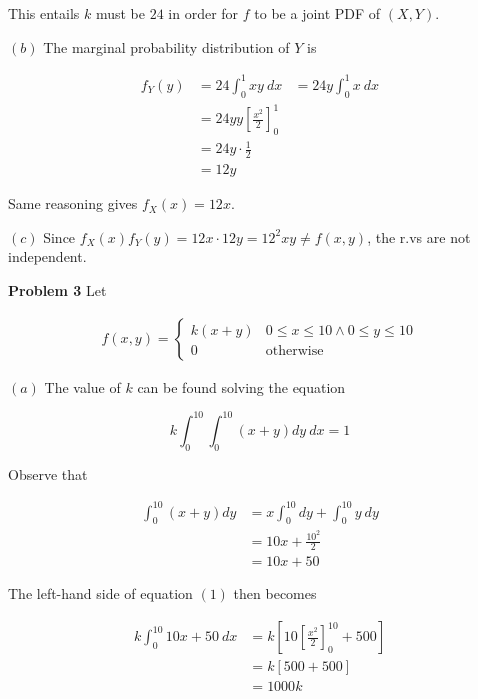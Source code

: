 \documentclass[a4paper, 12pt]{article}
\begin{document}
This entails $k$ must be $24$ in order for $f$ to be a joint PDF of $(X, Y)$.


$(b)$ The marginal probability distribution of $Y$ is 

\begin{align*}
    f_Y(y) &= 24\int_0^1 xy ~ dx &= 24y \int_0^1 x ~ dx \\ 
                       &=24y y \left[ \frac{x^2}{2} \right]_0^1 \\ 
                       &= 24 y \cdot \frac{1}{2} \\ 
                       &= 12y
\end{align*}


Same reasoning gives $f_X(x) = 12x$.

$(c)$ Since $f_X(x) f_Y(y) = 12x \cdot 12y = 12^2xy \neq f(x, y)$,
the r.vs are not independent.

\pagebreak 

\textbf{Problem 3} Let 

\begin{align*}
    f(x, y) = \begin{cases}
        k(x + y) & 0 \leq x \leq 10 \land  0 \leq y \leq 10 \\ 
        0 & \text{otherwise}
    \end{cases}
\end{align*}

$(a)$ The value of $k$ can be found solving the equation

\begin{equation}
    k \int_0^{10} \int_0^{10} (x + y) dy ~ dx = 1
\end{equation}

Observe that 

\begin{align*}
    \int_0^{10}(x+y) dy &= x\int_0^{10} dy + \int_0^{10} y ~ dy \\ 
                        &= 10x + \frac{10^2}{2} \\ 
                        &= 10x + 50
\end{align*}

The left-hand side of equation $(1)$ then becomes 

\begin{align*}
    k \int_0^{10} 10x + 50 ~ dx &= k \left[ 10 \left[ \frac{x^2}{2} \right]^{10}_0 + 500  \right]  \\ 
                                &=k \left[ 500 + 500 \right] \\ 
                                &=1000k
\end{align*}
\end{document}
